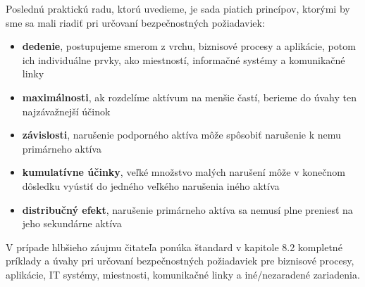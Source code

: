 Poslednú praktickú radu, ktorú uvedieme, je sada piatich princípov, ktorými by sme sa mali riadiť pri určovaní
bezpečnostných požiadaviek:
\begin{itemize}[nosep]
    \item \textbf{dedenie}, postupujeme smerom z vrchu, biznisové procesy a aplikácie, potom ich individuálne prvky, ako miestností, informačné systémy a komunikačné linky
    \item \textbf{maximálnosti}, ak rozdelíme aktívum na menšie častí, berieme do úvahy ten najzávažnejší účinok
    \item \textbf{závislosti}, narušenie podporného aktíva môže spôsobiť narušenie k nemu primárneho aktíva
    \item \textbf{kumulatívne účinky}, veľké množstvo malých narušení môže v konečnom dôsledku vyústiť do jedného veľkého narušenia iného aktíva
    \item \textbf{distribučný efekt}, narušenie primárneho aktíva sa nemusí plne preniesť na jeho sekundárne aktíva
\end{itemize}

V prípade hlbšieho záujmu čitateľa ponúka štandard \cite{BSI2} v kapitole 8.2 kompletné príklady a úvahy pri určovaní
bezpečnostných požiadaviek pre biznisové procesy, aplikácie, IT systémy, miestnosti, komunikačné linky a
iné/nezaradené zariadenia.
